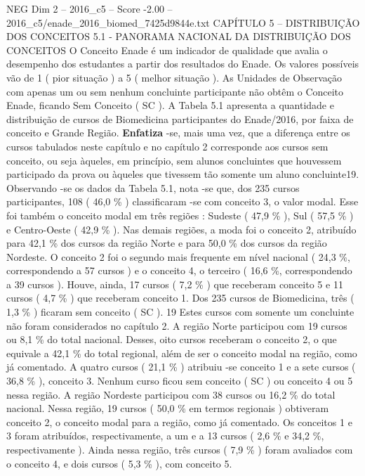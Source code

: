 \begin{textsample}{NEG Dim 2 – 2016\_c5 – Score -2.00 – 2016\_c5/enade\_2016\_biomed\_7425d9844e.txt}  \label{ex:f2_neg_039}
CAPÍTULO 5 – DISTRIBUIÇÃO DOS CONCEITOS 5.1 - PANORAMA NACIONAL DA DISTRIBUIÇÃO DOS CONCEITOS O Conceito Enade é um indicador de qualidade que avalia o desempenho dos estudantes a partir dos resultados do Enade.
Os valores possíveis vão de 1 ( pior situação ) a 5 ( melhor situação ).
As Unidades de Observação com apenas um ou sem nenhum concluinte participante não obtêm o Conceito Enade, ficando Sem Conceito ( SC ).
A Tabela 5.1 apresenta a quantidade e distribuição de cursos de Biomedicina participantes do Enade/2016, por faixa de conceito e Grande Região. \textbf{Enfatiza} -se, mais uma vez, que a diferença entre os cursos tabulados neste capítulo e no capítulo 2 corresponde aos cursos sem conceito, ou seja àqueles, em princípio, sem alunos concluintes que houvessem participado da prova ou àqueles que tivessem tão somente um aluno concluinte19.
Observando -se os dados da Tabela 5.1, nota -se que, dos 235 cursos participantes, 108 ( 46,0 \% ) classificaram -se com conceito 3, o valor modal.
Esse foi também o conceito modal em três regiões : Sudeste ( 47,9 \% ), Sul ( 57,5 \% ) e Centro-Oeste ( 42,9 \% ).
Nas demais regiões, a moda foi o conceito 2, atribuído para 42,1 \% dos cursos da região Norte e para 50,0 \% dos cursos da região Nordeste.
O conceito 2 foi o segundo mais frequente em nível nacional ( 24,3 \%, correspondendo a 57 cursos ) e o conceito 4, o terceiro ( 16,6 \%, correspondendo a 39 cursos ).
Houve, ainda, 17 cursos ( 7,2 \% ) que receberam conceito 5 e 11 cursos ( 4,7 \% ) que receberam conceito 1.
Dos 235 cursos de Biomedicina, três ( 1,3 \% ) ficaram sem conceito ( SC ). 19 Estes cursos com somente um concluinte não foram considerados no capítulo 2.
A região Norte participou com 19 cursos ou 8,1 \% do total nacional.
Desses, oito cursos receberam o conceito 2, o que equivale a 42,1 \% do total regional, além de ser o conceito modal na região, como já comentado.
A quatro cursos ( 21,1 \% ) atribuiu -se conceito 1 e a sete cursos ( 36,8 \% ), conceito 3.
Nenhum curso ficou sem conceito ( SC ) ou conceito 4 ou 5 nessa região.
A região Nordeste participou com 38 cursos ou 16,2 \% do total nacional.
Nessa região, 19 cursos ( 50,0 \% em termos regionais ) obtiveram conceito 2, o conceito modal para a região, como já comentado.
Os conceitos 1 e 3 foram atribuídos, respectivamente, a um e a 13 cursos ( 2,6 \% e 34,2 \%, respectivamente ).
Ainda nessa região, três cursos ( 7,9 \% ) foram avaliados com o conceito 4, e dois cursos ( 5,3 \% ), com conceito 5.

\end{textsample}
